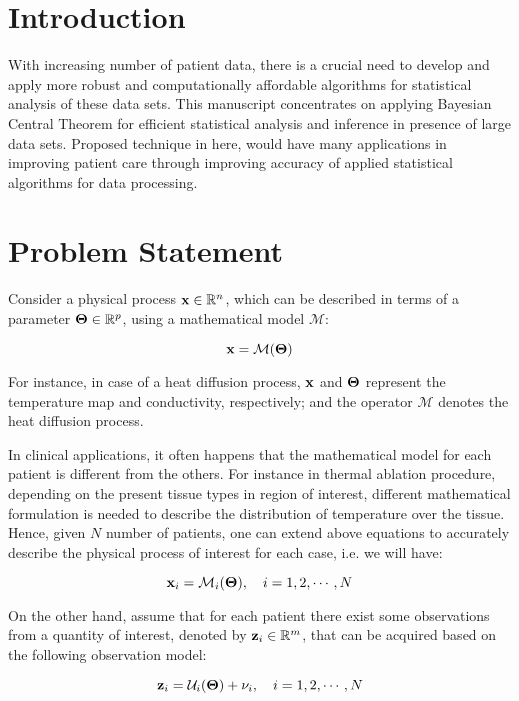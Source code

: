 \documentclass[]{article}
\begin{document}
\section*{Introduction}
With increasing number of patient data, there is a crucial need to develop and apply more robust and computationally affordable algorithms for statistical analysis of these data sets. This manuscript concentrates  on applying Bayesian Central Theorem for efficient statistical analysis and inference in presence of large data sets. Proposed technique in here, would have many applications in improving patient care through improving accuracy of applied statistical algorithms for data processing.


\section*{Problem Statement}\label{sec:prob_statement}
Consider a physical process $\mathbf{x} \in \mathbb R^{n}$, which can be described in terms of a parameter $\boldsymbol{\Theta}\in\mathbb R^{p}$, using a mathematical model $\mathcal{M}$:

\begin{equation}\label{model}
\mathbf{x}=\mathcal{M}(\boldsymbol{\Theta})
\end{equation}

For instance, in case of a heat diffusion process, $\mathbf{x}$ and $\boldsymbol{\Theta}$ represent the temperature map and conductivity, respectively; and the operator $\mathcal{M}$ denotes the heat diffusion process.

In clinical applications, it often happens that the mathematical model for each patient is different from the others. For instance in thermal ablation procedure, depending on the present tissue types in region of interest, different mathematical formulation is needed to describe the distribution of temperature over the tissue. Hence, given $N$ number of patients, one can extend above equations to accurately describe the physical process of interest for each case, i.e. we will have:

\begin{equation}\label{modelN}
\mathbf{x}_i=\mathcal{M}_i(\boldsymbol{\Theta}),\quad i=1,2,\cdots, N
\end{equation}

On the other hand, assume that for each patient there exist some observations from a quantity of interest, denoted by $\mathbf{z}_i \in \mathbb R^m$, that can be acquired based on the following observation model:

\begin{equation}\label{obsmodelN}
\mathbf{z}_i=\mathcal{U}_i(\boldsymbol{\Theta})+\nu_i, \quad i=1,2,\cdots,N
\end{equation}
\end{document}
